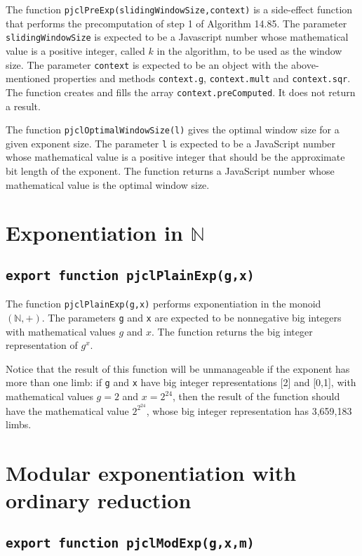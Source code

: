 \documentclass[12pt]{article}
\begin{document}
The function {\tt pjclPreExp(slidingWindowSize,context)} is a side-effect function 
that performs the
precomputation of step 1 of Algorithm 14.85.  The parameter {\tt
  slidingWindowSize} is expected to be a Javascript number whose
mathematical value is a positive integer, called $k$ in the algorithm,
to be used as the window size.  The parameter {\tt context} is
expected to be an object with the above-mentioned properties and
methods {\tt context.g}, {\tt context.mult} and {\tt context.sqr}.
The function creates and fills the array {\tt context.preComputed}.
It does not return a result.

The function {\tt pjclOptimalWindowSize(l)} gives the optimal window
size for a given exponent size.  The parameter {\tt l} is expected to
be a JavaScript number whose mathematical value is a positive integer that should be the approximate
bit length of the exponent.  The function returns a JavaScript number
whose mathematical value is the optimal window size.

\section{Exponentiation in $\mathbb{N}$}

\subsection{\tt export function pjclPlainExp(g,x)}

The function {\tt pjclPlainExp(g,x)} performs exponentiation in the
monoid $(\mathbb{N},+)$.  The parameters {\tt g} and {\tt x} are
expected to be nonnegative big integers with mathematical values $g$
and $x$.  The function returns the big integer representation of
$g^x$.

Notice that the result of this function will be unmanageable if the
exponent has more than one limb: if {\tt g} and {\tt x} have big
integer representations [2] and [0,1], with mathematical values $g =
2$ and $x = 2^{24}$, then the result of the function should have the mathematical
value $2^{2^{24}}$, whose big integer representation has 3,659,183
limbs.

\section{Modular exponentiation with ordinary reduction}

\subsection{\tt export function pjclModExp(g,x,m)}
\end{document}
